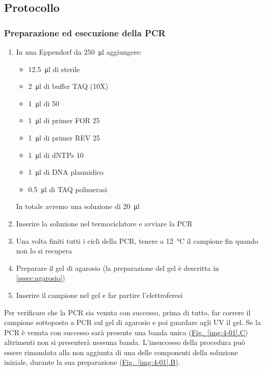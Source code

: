 \subsection{Protocollo}
\subsubsection{Preparazione ed esecuzione della PCR }
\begin{enumerate}
	\item In una Eppendorf da \qty{250}{\micro\litre} aggiungere:
	      \begin{itemize}[person] %
		      \item \qty{12.5}{\micro\litre} di  sterile
		      \item \qty{2}{\micro\litre} di buffer TAQ (10X)
		      \item \qty{1}{\micro\litre} di  \qty{50}{\milli\Molar}
		      \item \qty{1}{\micro\litre} di primer FOR \qty{25}{\milli\Molar}
		      \item \qty{1}{\micro\litre} di primer REV \qty{25}{\milli\Molar}
		      \item \qty{1}{\micro\litre} di dNTPs \qty{10}{\milli\Molar}
		      \item \qty{1}{\micro\litre} di DNA plasmidico
		      \item \qty{0.5}{\micro\litre} di TAQ polimerasi
	      \end{itemize}
	      In totale avremo una soluzione di \qty{20}{\micro\litre}
	\item Inserire la soluzione nel termociclatore e avviare la PCR
	\item Una volta finiti tutti i cicli della PCR, tenere a \qty{12}{\celsius} il campione fin quando non lo si recupera
	\item Preparare il gel di agarosio (la preparazione del gel è descritta in \ref{sssec:agarosio})
	\item Inserire il campione nel gel e far partire l'elettroferesi
\end{enumerate}

Per verificare che la PCR sia venuta con successo, prima di tutto, far correre il campione sottoposto a PCR sul gel di agarosio e poi guardare agli UV il gel. Se la PCR è venuta con successo sarà presente una banda unica (\hyperref[img:4-01]{Fig.~\ref{img:4-01}.C}) altrimenti non si presenterà nessuna banda. L'insuccesso della procedura può essere rimandata alla non aggiunta di una delle componenti della soluzione iniziale, durante la sua preparazione (\hyperref[img:4-01]{Fig.~\ref{img:4-01}.B}). 

